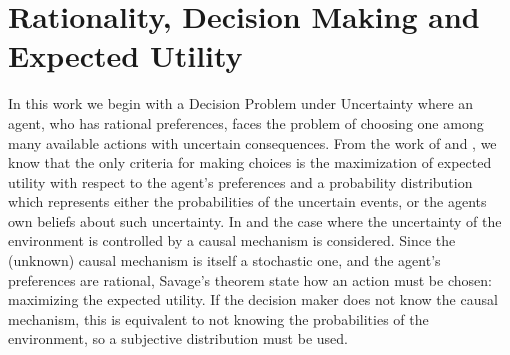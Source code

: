 \documentclass[letterpaper]{article}
\begin{document}
\section{Rationality, Decision Making and Expected Utility}
In this work we begin with a Decision Problem under Uncertainty where an agent, who has rational preferences, faces the problem of choosing one among many available actions with uncertain consequences. From the work of \cite{von1944theory} and \cite{savage1954the}, we know that the only criteria for making choices is the maximization of expected utility with respect to the agent's preferences and a probability distribution which represents either the probabilities of the uncertain events, or the agents own beliefs about such uncertainty. In \cite{gonzalez2018playing} and \cite{2019arXiv190202279G} the case where the uncertainty of the environment is controlled by a causal mechanism is considered. Since the (unknown) causal mechanism is itself a stochastic one, and the agent's preferences are rational, Savage's theorem state how an action must be chosen: maximizing the expected utility. If the decision maker does not know the causal mechanism, this is equivalent to not knowing the probabilities of the environment, so a subjective distribution must be used. 
\end{document}
